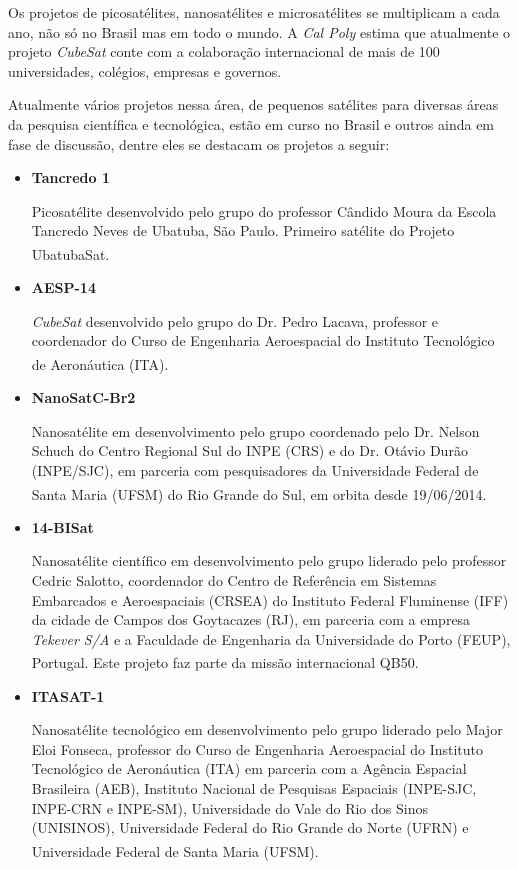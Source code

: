 \documentclass[
	12pt,				%
	openright,			%
	oneside,			%
	a4paper,			%
	english,			%
	french,				%
	spanish,			%
	brazil,				%
	oldfontcommands
	]{abntex2}
\begin{document}
	Os projetos de picosatélites, nanosatélites e microsatélites se multiplicam a cada ano, não só no Brasil mas em todo o mundo. A \textit{Cal Poly} estima que atualmente o projeto \textit{CubeSat} conte com a colaboração internacional de mais de 100 universidades, colégios, empresas e governos.
	
	Atualmente vários projetos nessa área, de pequenos satélites para diversas áreas da pesquisa científica e tecnológica, estão em curso no Brasil e outros ainda em fase de discussão, dentre eles se destacam os projetos a seguir:
	\pagebreak
	
	\begin{itemize}
		\item \textbf{Tancredo 1}
		
			Picosatélite desenvolvido pelo grupo do professor Cândido Moura da Escola Tancredo Neves de Ubatuba, São Paulo. Primeiro satélite do Projeto UbatubaSat.\textsuperscript{\cite{UbatubaSat}}
			
		\item \textbf{AESP-14}		
		
			\textit{CubeSat} desenvolvido pelo grupo do Dr. Pedro Lacava, professor e coordenador do Curso de Engenharia Aeroespacial do Instituto Tecnológico de Aeronáutica (ITA).\textsuperscript{\cite{AESP14}}
			
		\item \textbf{NanoSatC-Br2}
		
			Nanosatélite em desenvolvimento pelo grupo coordenado pelo Dr. Nelson Schuch do Centro Regional Sul do INPE (CRS) e do Dr. Otávio Durão (INPE/SJC), em parceria com pesquisadores da Universidade Federal de Santa Maria (UFSM) do Rio Grande do Sul, em orbita desde 19/06/2014.\textsuperscript{\cite{INPE}}

		\item \textbf{14-BISat}

			Nanosatélite científico em desenvolvimento pelo grupo liderado pelo professor Cedric Salotto, coordenador do Centro de Referência em Sistemas Embarcados e Aeroespaciais (CRSEA) do Instituto Federal Fluminense (IFF) da cidade de Campos dos Goytacazes (RJ), em parceria com a empresa \textit{Tekever S/A} e a Faculdade de Engenharia da Universidade do Porto (FEUP), Portugal. Este projeto faz parte da missão internacional QB50.\textsuperscript{\cite{IFF}}
			
		\item \textbf{ITASAT-1}	

			Nanosatélite tecnológico em desenvolvimento pelo grupo liderado pelo Major Eloi Fonseca, professor do Curso de Engenharia Aeroespacial do Instituto Tecnológico de Aeronáutica (ITA) em parceria com a Agência Espacial Brasileira (AEB), Instituto Nacional de Pesquisas Espaciais (INPE-SJC, INPE-CRN e INPE-SM), Universidade do Vale do Rio dos Sinos (UNISINOS), Universidade Federal do Rio Grande do Norte (UFRN) e Universidade Federal de Santa Maria (UFSM).\textsuperscript{\cite{ITASAT}}	
			
	\end{itemize}
\end{document}
